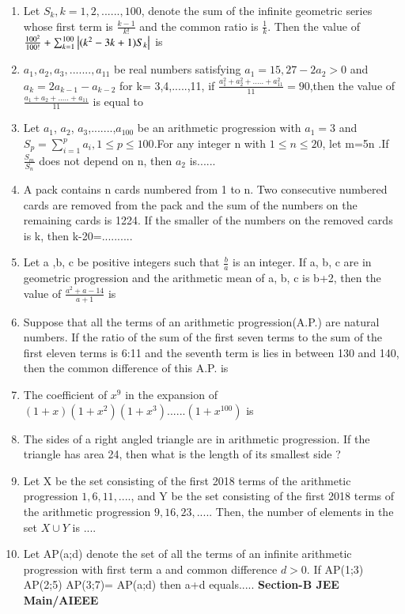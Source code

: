 \begin{enumerate}[label=\arabic*.,ref=\thesubsection.\theenumi]
\item Let $S_k, k= 1, 2,......, 100$, denote the sum of the infinite geometric series whose first term is $\frac{k-1}{k!}$ and the common ratio is $\frac{1}{k}$. Then the value of $\frac{100^2}{100!}+\sum_{k=1}^{100} \left\vert(k^2 - 3k + 1)S_k\right\vert$  is 
\item $a_1, a_2, a_3,.......,a_{11}$ be real numbers satisfying $a_1=15,27-2a_2>0$ and $a_k=2a_{k-1}-a_{k-2}$ for k= 3,4,.....,11, if $\frac{a_1^2 + a_2^2 +.....+a_{11}^2}{11}=90$,then the value of
$\frac{a_1 + a_2 +.....+a_{11}}{11}$ is equal to
\item Let $a_1$, $a_2$, $a_3$,.......,$a_{100}$ be an arithmetic progression with $a_1=3$ and $S_p=\sum_{i=1}^{p} a_i,1\leq p\leq 100$.For any integer n with $1\leq n\leq 20$, let m=5n .If $\frac{S_m}{S_n}$ does not depend on n, then $a_2$ is......
\item A pack contains n cards numbered from 1 to n. Two consecutive numbered cards are removed from the pack and the sum of the numbers on the remaining cards is 1224. If the smaller of the numbers on the removed cards is k, then k-20=..........
\item Let a ,b, c be positive integers such that $\frac{b}{a}$ is an integer. If a, b, c are in geometric progression and the arithmetic mean of a, b, c is b+2, then the value of 
$\frac{a^2+a-14}{a+1}$ is 
\item Suppose that all the terms of an arithmetic progression(A.P.)
are natural numbers. If the ratio of the sum of the first seven terms to the sum of the first eleven terms is 6:11 and the seventh term is lies in between 130 and 140, then the common difference of this A.P. is
\item The coefficient of $x^9$ in the expansion of $(1+x)(1+x^2)(1+x^3)......(1+x^{100})$ is
\item The sides of a right angled triangle are in arithmetic progression. If the triangle has area 24, then what is the length of its smallest side ?
\item Let X be the set consisting of the first 2018 terms of the arithmetic progression $1, 6, 11,....$, and Y be the set consisting of the first 2018 terms of the arithmetic progression $9, 16, 23,.....$ Then, the number of elements in the set $X\cup Y$ is ....
\item Let AP(a;d) denote the set of all the terms of an infinite arithmetic progression with first term a and common difference $d>0$. If AP(1;3) AP(2;5) AP(3;7)= AP(a;d) then a+d equals.....
{\textbf {Section-B JEE Main/AIEEE} }

\end{enumerate}
